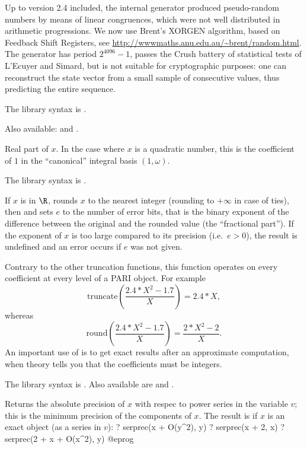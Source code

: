 Up to
version 2.4 included, the internal generator produced pseudo-random numbers
by means of linear congruences, which were not well distributed in arithmetic
progressions. We now
use Brent's XORGEN algorithm, based on Feedback Shift Registers, see
\url{http://wwwmaths.anu.edu.au/~brent/random.html}. The generator has period
$2^{4096}-1$, passes the Crush battery of statistical tests of L'Ecuyer and
Simard, but is not suitable for cryptographic purposes: one can reconstruct
the state vector from a small sample of consecutive values, thus predicting
the entire sequence.

The library syntax is .

 Also available:  and .

\label{se:real}
Real part of $x$. In the case where $x$ is a quadratic number, this is the
coefficient of $1$ in the ``canonical'' integral basis $(1,\omega)$.

The library syntax is .

\label{se:round}
If $x$ is in $\R$, rounds $x$ to the nearest integer (rounding to
$+\infty$ in case of ties), then and sets $e$ to the number of error bits,
that is the binary exponent of the difference between the original and the
rounded value (the ``fractional part''). If the exponent of $x$ is too large
compared to its precision (i.e.~$e>0$), the result is undefined and an error
occurs if $e$ was not given.

 Contrary to the other truncation functions,
this function operates on every coefficient at every level of a PARI object.
For example
$$\text{truncate}\left(\dfrac{2.4*X^2-1.7}{X}\right)=2.4*X,$$
whereas
$$\text{round}\left(\dfrac{2.4*X^2-1.7}{X}\right)=\dfrac{2*X^2-2}{X}.$$
An important use of  is to get exact results after an approximate
computation, when theory tells you that the coefficients must be integers.

The library syntax is .
Also available are  and
.

\label{se:serprec}
Returns the absolute precision of $x$ with respec to power series
in the variable $v$; this is the
minimum precision of the components of $x$. The result is  if $x$
is an exact object (as a series in $v$):
\bprog
? serprec(x + O(y^2), y)
? serprec(x + 2, x)
? serprec(2 + x + O(x^2), y)
@eprog


